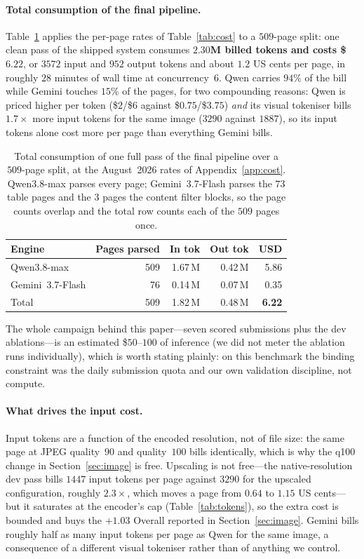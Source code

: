 \documentclass[11pt]{article}
\begin{document}
\paragraph{Total consumption of the final pipeline.} Table~\ref{tab:total} applies the
per-page rates of Table~\ref{tab:cost} to a $509$-page split: one clean pass of the
shipped system consumes \textbf{$2.30$M billed tokens and costs \$$6.22$}, or $3572$
input and $952$ output tokens and about $1.2$ US cents per page, in roughly $28$
minutes of wall time at concurrency~$6$. Qwen carries $94\%$ of the bill while Gemini
touches $15\%$ of the pages, for two compounding reasons: Qwen is priced higher per
token (\$$2$/\$$6$ against \$$0.75$/\$$3.75$) \emph{and} its visual tokeniser bills
$1.7\times$ more input tokens for the same image ($3290$ against $1887$), so its input
tokens alone cost more per page than everything Gemini bills.

\begin{table}[t]
\centering
\small
\begin{tabular}{lrrrr}
\toprule
Engine & Pages parsed & In tok & Out tok & USD \\
\midrule
Qwen3.8-max & 509 & 1.67\,M & 0.42\,M & 5.86 \\
Gemini~3.7-Flash & 76 & 0.14\,M & 0.07\,M & 0.35 \\
\midrule
Total & 509 & 1.82\,M & 0.48\,M & \textbf{6.22} \\
\bottomrule
\end{tabular}
\caption{Total consumption of one full pass of the final pipeline over a $509$-page
split, at the August~2026 rates of Appendix~\ref{app:cost}. Qwen3.8-max parses every
page; Gemini~3.7-Flash parses the $73$ table pages and the $3$ pages the content
filter blocks, so the page counts overlap and the total row counts each of the $509$
pages once.}
\label{tab:total}
\end{table} The whole campaign behind this paper---seven scored submissions plus the
dev ablations---is an estimated \$$50$--$100$ of inference (we did not meter the
ablation runs individually), which is worth stating plainly: on this benchmark the
binding constraint was the daily submission quota and our own validation discipline,
not compute.

\paragraph{What drives the input cost.} Input tokens are a function of the encoded
resolution, not of file size: the same page at JPEG quality~$90$ and quality~$100$
bills identically, which is why the q100 change in Section~\ref{sec:image} is free.
Upscaling is not free---the native-resolution dev pass bills $1447$ input tokens per
page against $3290$ for the upscaled configuration, roughly $2.3\times$, which moves a
page from $0.64$ to $1.15$ US cents---but it saturates at
the encoder's cap (Table~\ref{tab:tokens}), so the extra cost is bounded and buys the
$+1.03$ Overall reported in Section~\ref{sec:image}. Gemini bills roughly half as many
input tokens per page as Qwen for the same image, a consequence of a different visual
tokeniser rather than of anything we control.
\end{document}
